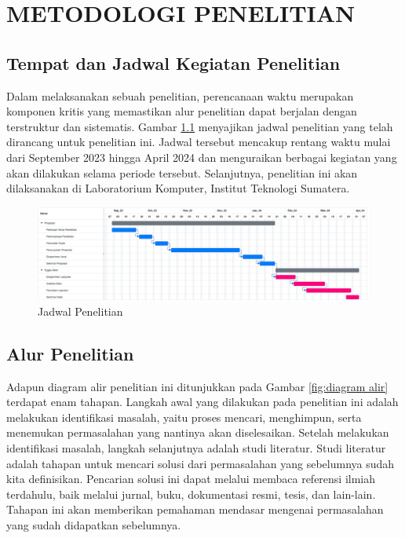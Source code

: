 \chapter{METODOLOGI PENELITIAN}
\section{Tempat dan Jadwal Kegiatan Penelitian}
Dalam melaksanakan sebuah penelitian, perencanaan waktu merupakan komponen kritis yang memastikan alur penelitian dapat berjalan dengan terstruktur dan sistematis. Gambar \ref{fig:jadwal-penelitian} menyajikan jadwal penelitian yang telah dirancang untuk penelitian ini. Jadwal tersebut mencakup rentang waktu mulai dari September 2023 hingga April 2024 dan menguraikan berbagai kegiatan yang akan dilakukan selama periode tersebut. Selanjutnya, penelitian ini akan dilaksanakan di Laboratorium Komputer, Institut Teknologi Sumatera.

\begin{figure}[h!]
    \centering
    \includegraphics[width=1\textwidth]{figures/ch03/Timeline-2.png}
    \caption{Jadwal Penelitian}
    \label{fig:jadwal-penelitian}
\end{figure}


\section{Alur Penelitian}
Adapun diagram alir penelitian ini ditunjukkan pada Gambar \ref{fig:diagram alir} terdapat enam tahapan. Langkah awal yang dilakukan pada penelitian ini adalah melakukan identifikasi masalah, yaitu proses mencari, menghimpun, serta menemukan permasalahan yang nantinya akan diselesaikan. Setelah melakukan identifikasi masalah, langkah selanjutnya adalah studi literatur. Studi literatur adalah tahapan untuk mencari solusi dari permasalahan yang sebelumnya sudah kita definisikan. Pencarian solusi ini dapat melalui membaca referensi ilmiah terdahulu, baik melalui jurnal, buku, dokumentasi resmi, tesis, dan lain-lain. Tahapan ini akan memberikan pemahaman mendasar mengenai permasalahan yang sudah didapatkan sebelumnya. 

